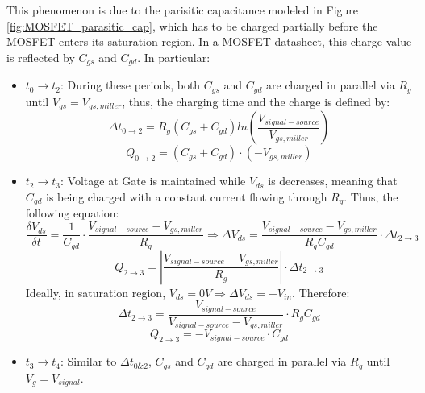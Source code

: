 \documentclass[main.tex]{subfiles}
\begin{document}
    \justify
    This phenomenon is due to the parisitic capacitance modeled in Figure \ref{fig:MOSFET_parasitic_cap}, which has to be charged partially before the MOSFET enters its saturation region. In a MOSFET datasheet, this charge value is reflected by $C_{gs}$ and $C_{gd}$. In particular:

    \begin{itemize}
        \item $t_0 \rightarrow t_2$: During these periods, both $C_{gs}$ and $C_{gd}$ are charged in parallel via $R_{g}$ until $V_{gs} = V_{gs, miller}$, thus, the charging time and the charge is defined by:
        \begin{equation}
            \Delta t_{0\rightarrow2}=R_{g}(C_{gs} +C_{gd})ln\left(\dfrac{V_{signal-source}}{V_{gs, miller}}\right)
        \end{equation}
        \begin{equation}
            Q_{0\rightarrow2}=(C_{gs} +C_{gd})\cdot (-V_{gs, miller})
        \end{equation}
        \item $t_2 \rightarrow t_3$: Voltage at Gate is maintained while $V_{ds}$ is decreases, meaning that $C_{gd}$ is being charged with a constant current flowing through $R_{g}$. Thus, the following equation: 
        \begin{equation}
            \dfrac{\delta V_{ds}}{\delta t}=\dfrac{1}{C_{gd}}\cdot\dfrac{V_{signal-source} - V_{gs,miller}}{R_{g}} \Rightarrow \Delta V_{ds} = \dfrac{V_{signal-source} - V_{gs,miller}}{R_{g}C_{gd}}\cdot \Delta t_{2\rightarrow3}
        \end{equation}
        \begin{equation}
            Q_{2\rightarrow3}= \left| \dfrac{V_{signal-source} - V_{gs,miller}}{R_{g}} \right|\cdot \Delta t_{2\rightarrow3} 
        \end{equation}
        Ideally, in saturation region, $V_{ds} = 0V \Rightarrow \Delta V_{ds} = -V_{in}$. Therefore:
        \begin{equation}
            \Delta t_{2\rightarrow3}=\dfrac{V_{signal-source}}{V_{signal-source} - V_{gs,miller}}\cdot R_{g}C_{gd}
        \end{equation}
        \begin{equation}
            Q_{2\rightarrow3}= -V_{signal-source}\cdot C_{gd}
        \end{equation}
        \item $t_3 \rightarrow t_4$: Similar to $\Delta t_{0\&2}$, $C_{gs}$ and $C_{gd}$ are charged in parallel via $R_{g}$ until $V_{g} = V_{signal}$.
    \end{itemize}
\end{document}
